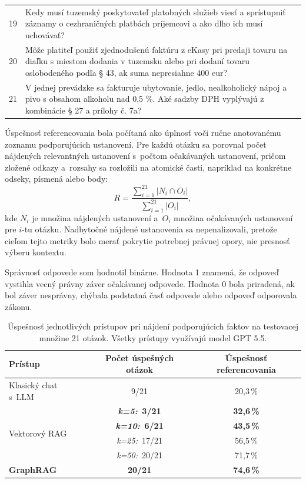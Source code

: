 \begin{longtable}{p{}p{}}
19 & Kedy musí tuzemský poskytovateľ platobných služieb viesť a sprístupniť záznamy o cezhraničných platbách príjemcovi a ako dlho ich musí uchovávať? \\
20 & Môže platiteľ použiť zjednodušenú faktúru z eKasy pri predaji tovaru na diaľku s miestom dodania v tuzemsku alebo pri dodaní tovaru oslobodeného podľa § 43, ak suma nepresiahne 400 eur? \\
21 & V jednej prevádzke sa fakturuje ubytovanie, jedlo, nealkoholický nápoj a pivo s obsahom alkoholu nad 0,5 \%. Aké sadzby DPH vyplývajú z kombinácie § 27 a prílohy č. 7a? \\
\end{longtable}
\endgroup

Úspešnosť referencovania bola počítaná ako úplnosť voči ručne anotovanému zoznamu podporujúcich ustanovení. Pre každú otázku sa porovnal počet nájdených relevantných ustanovení s~počtom očakávaných ustanovení, pričom zložené odkazy a~rozsahy sa rozložili na atomické časti, napríklad na konkrétne odseky, písmená alebo body:
\begin{equation}\label{eq:ref-recall}
R = \frac{\sum_{i=1}^{21} |N_i \cap O_i|}{\sum_{i=1}^{21} |O_i|},
\end{equation}
kde $N_i$ je množina nájdených ustanovení a~$O_i$ množina očakávaných ustanovení pre $i$-tu otázku. Nadbytočné nájdené ustanovenia sa nepenalizovali, pretože cieľom tejto metriky bolo merať pokrytie potrebnej právnej opory, nie presnosť výberu kontextu.

Správnosť odpovede som hodnotil binárne. Hodnota 1 znamená, že odpoveď vystihla vecný právny záver očakávanej odpovede. Hodnota 0 bola priradená, ak bol záver nesprávny, chýbala podstatná časť odpovede alebo odpoveď odporovala zákonu.

\begin{table}[h]
\centering
\caption[Úspešnosť prístupov pri nájdení podporujúcich faktov]{Úspešnosť jednotlivých prístupov pri nájdení podporujúcich faktov na testovacej množine 21 otázok. Všetky prístupy využívajú model GPT 5.5.}
\label{tab:retrieval-success}
\begin{tabular}{lcc}
\toprule
\textbf{Prístup} & \textbf{Počet úspešných otázok} & \textbf{Úspešnosť referencovania} \\
\midrule
Klasický chat s~LLM & 9/21 & 20{,}3\,\% \\
\multirow{4}{*}{Vektorový RAG} & \textbf{\emph{k=5:}\, 3/21} & \textbf{32{,}6\,\%} \\
 & \textbf{\emph{k=10:}\, 6/21} & \textbf{43{,}5\,\%} \\
 & \emph{k=25:}\, 17/21 & 56{,}5\,\% \\
 & \emph{k=50:}\, 20/21 & 71{,}7\,\% \\
\textbf{GraphRAG} & \textbf{20/21} & \textbf{74{,}6\,\%} \\
\bottomrule
\end{tabular}
\end{table}

